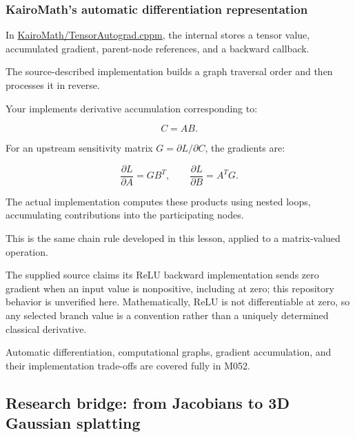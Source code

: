 \subsubsection{KairoMath's automatic differentiation representation}\label{02-foundations-ii-ch021-kairomaths-automatic-differentiation-representation}

\hypertarget{02-foundations-ii-ch021-kairomaths-automatic-differentiation-representation}{}

In \href{https://github.com/swayam8624/KairoMath/blob/master/TensorAutograd.cppm?utm_source=chatgpt.com}{KairoMath/TensorAutograd.cppm}, the internal  stores a tensor value, accumulated gradient, parent-node references, and a backward callback.

The source-described  implementation builds a graph traversal order and then processes it in reverse.

Your  implements derivative accumulation corresponding to:

\[
C=AB.
\]

For an upstream sensitivity matrix \(G=\partial L/\partial C\), the gradients are:

\[
\boxed{ \frac{\partial L}{\partial A}=GB^T, \qquad \frac{\partial L}{\partial B}=A^TG }.
\]

The actual implementation computes these products using nested loops, accumulating contributions into the participating nodes.

This is the same chain rule developed in this lesson, applied to a matrix-valued operation.

The supplied source claims its ReLU backward implementation sends zero gradient when an input value is nonpositive, including at zero; this repository behavior is unverified here. Mathematically, ReLU is not differentiable at zero, so any selected branch value is a convention rather than a uniquely determined classical derivative.

Automatic differentiation, computational graphs, gradient accumulation, and their implementation trade-offs are covered fully in M052.

\subsection{Research bridge: from Jacobians to 3D Gaussian splatting}\label{02-foundations-ii-ch021-research-bridge-from-jacobians-to-3d-gaussian-splatting}

